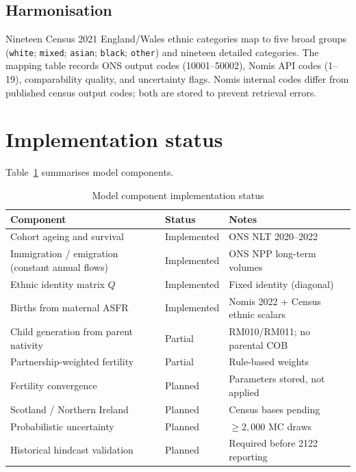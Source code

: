 \documentclass[12pt,a4paper]{article}
\begin{document}
\subsection{Harmonisation}

Nineteen Census 2021 England/Wales ethnic categories map to five broad groups
(\texttt{white}; \texttt{mixed}; \texttt{asian}; \texttt{black}; \texttt{other}) and
nineteen detailed categories. The mapping table records ONS output codes (10001--50002),
Nomis API codes (1--19), comparability quality, and uncertainty flags. Nomis internal codes
differ from published census output codes; both are stored to prevent retrieval errors.

\section{Implementation status}

Table~\ref{tab:implementation} summarises model components.

\begin{table}[H]
\centering
\caption{Model component implementation status}
\label{tab:implementation}
\begin{tabular}{lll}
\toprule
\textbf{Component} & \textbf{Status} & \textbf{Notes} \\
\midrule
Cohort ageing and survival & Implemented & ONS NLT 2020--2022 \\
Immigration / emigration (constant annual flows) & Implemented & ONS NPP long-term volumes \\
Ethnic identity matrix $Q$ & Implemented & Fixed identity (diagonal) \\
Births from maternal ASFR & Implemented & Nomis 2022 + Census ethnic scalars \\
Child generation from parent nativity & Partial & RM010/RM011; no parental COB \\
Partnership-weighted fertility & Partial & Rule-based weights \\
Fertility convergence & Planned & Parameters stored, not applied \\
Scotland / Northern Ireland & Planned & Census bases pending \\
Probabilistic uncertainty & Planned & $\geq 2{,}000$ MC draws \\
Historical hindcast validation & Planned & Required before 2122 reporting \\
\bottomrule
\end{tabular}
\end{table}
\end{document}
